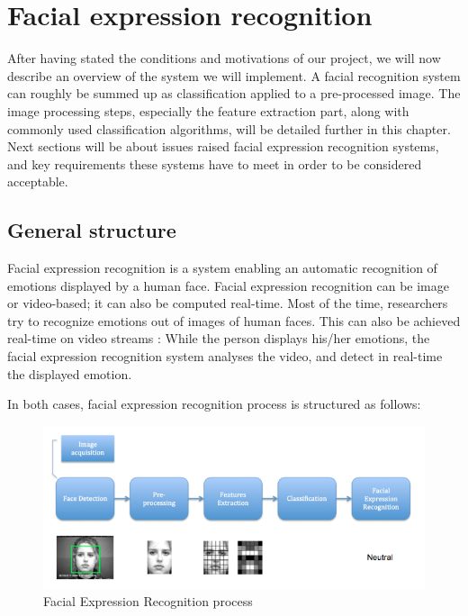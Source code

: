 \phantom{}
\chapter{Facial expression recognition}

\noindent After having stated the conditions and motivations of our project, we will now describe an overview of the system we will implement. A facial recognition system can roughly be summed up as classification applied to a pre-processed image. The image processing steps, especially the feature extraction part, along with commonly used classification algorithms, will be detailed further in this chapter. Next sections will be about issues raised facial expression recognition systems, and key requirements these systems have to meet in order to be considered acceptable.

\section{General structure}

\noindent Facial expression recognition is a system enabling an automatic recognition of emotions displayed by a human face. Facial expression recognition can be image or video-based; it can also be computed real-time. Most of the time, researchers try to recognize emotions out of images of human faces. This can also be achieved real-time on video streams : While the person displays his/her emotions, the facial expression recognition system analyses the video, and detect in real-time the displayed emotion.
\newline

\noindent In both cases, facial expression recognition process is structured as follows:
\newline

\begin{figure}[!h]
\begin{center}
\noindent \includegraphics[scale=0.6]{figures/facial_expression_recognition_process} 
\newline
\caption{Facial Expression Recognition process}
\label{facial_expression_recognition_process}
\end{center} 
\end{figure}

